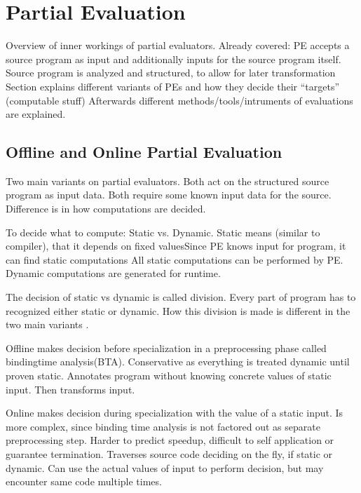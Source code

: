 
\section{Partial Evaluation}\label{sec:partial-evaluation}

Overview of inner workings of partial evaluators.
Already covered: PE accepts a source program as input and additionally inputs for the source program itself.
Source program is analyzed and structured, to allow for later transformation
Section explains different variants of PEs and how they decide their ``targets'' (computable stuff)
Afterwards different methods/tools/intruments of evaluations are explained.


\subsection{Offline and Online Partial Evaluation}\label{sec:offline-vs-online}

Two main variants on partial evaluators.
Both act on the structured source program as input data.
Both require some known input data for the source.
Difference is in how computations are decided.

To decide what to compute: Static vs. Dynamic.
Static means (similar to compiler), that it depends on fixed values\citationneeded[Does it?]
Since PE knows input for program, it can find static computations
All static computations can be performed by PE.
Dynamic computations are generated for runtime.

The decision of static vs dynamic is called division.
Every part of program has to recognized either static or dynamic.
How this division is made is different in the two main variants .


Offline makes decision before specialization in a preprocessing phase called bindingtime analysis(BTA).
Conservative as everything is treated dynamic until proven static.
Annotates program  without knowing concrete values of static input.
Then transforms input.

Online makes decision during specialization with the value of a static input.
Is more complex, since binding time analysis is not factored out as separate preprocessing step.
Harder to predict speedup, difficult to self application or guarantee termination.
Traverses source code deciding on the fly, if static or dynamic.
Can use the actual values of input to perform decision, but may encounter same code multiple times.


